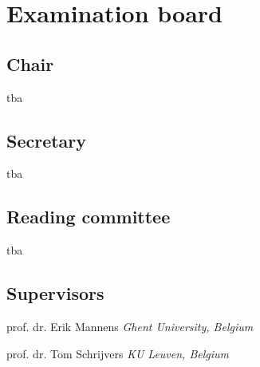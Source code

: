 \chapter*{Examination board}

\section*{Chair}

tba

\section*{Secretary}

tba

\section*{Reading committee}

tba

\section*{Supervisors}

prof. dr. Erik Mannens {\smaller \emph{Ghent University, Belgium}}

prof. dr. Tom Schrijvers {\smaller \emph{KU Leuven, Belgium}}
